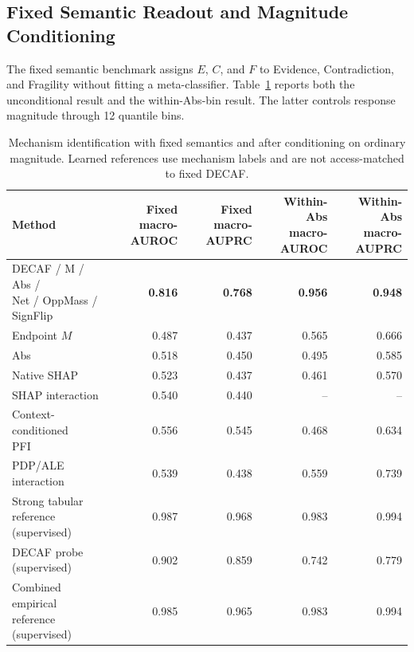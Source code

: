 \subsection{Fixed Semantic Readout and Magnitude Conditioning}
\label{app:covertype-fixed-semantic}

The fixed semantic benchmark assigns $E$, $C$, and $F$ to Evidence, Contradiction, and Fragility without fitting a meta-classifier. Table~\ref{tab:covertype-fixed-semantic} reports both the unconditional result and the within-Abs-bin result. The latter controls response magnitude through 12 quantile bins.

\begin{table}[!tb]
\centering
\caption{Mechanism identification with fixed semantics and after conditioning on ordinary magnitude. Learned references use mechanism labels and are not access-matched to fixed DECAF.}
\label{tab:covertype-fixed-semantic}
\footnotesize
\begin{tabular}{lrrrr}
\toprule
Method & \makecell[r]{Fixed\\macro-AUROC} & \makecell[r]{Fixed\\macro-AUPRC} & \makecell[r]{Within-Abs\\macro-AUROC} & \makecell[r]{Within-Abs\\macro-AUPRC} \\
\midrule
\makecell[l]{DECAF / M / Abs /\\ Net / OppMass / SignFlip} & \textbf{0.816} & \textbf{0.768} & \textbf{0.956} & \textbf{0.948} \\
Endpoint $M$ & 0.487 & 0.437 & 0.565 & 0.666 \\
Abs & 0.518 & 0.450 & 0.495 & 0.585 \\
Native SHAP & 0.523 & 0.437 & 0.461 & 0.570 \\
SHAP interaction & 0.540 & 0.440 & -- & -- \\
\makecell[l]{Context-conditioned\\PFI} & 0.556 & 0.545 & 0.468 & 0.634 \\
PDP/ALE interaction & 0.539 & 0.438 & 0.559 & 0.739 \\
\addlinespace
\makecell[l]{Strong tabular reference\\(supervised)} & 0.987 & 0.968 & 0.983 & 0.994 \\
\makecell[l]{DECAF probe\\(supervised)} & 0.902 & 0.859 & 0.742 & 0.779 \\
\makecell[l]{Combined empirical\\reference (supervised)} & 0.985 & 0.965 & 0.983 & 0.994 \\
\bottomrule
\end{tabular}
\end{table}

